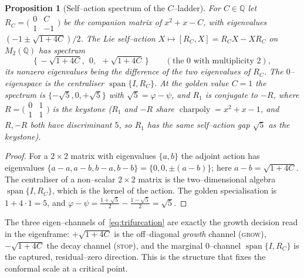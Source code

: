 \documentclass[11pt]{article}
\theoremstyle{plain}
\newtheorem{proposition}[theorem]{Proposition}
\theoremstyle{definition}
\theoremstyle{remark}
\newcommand{\Q}{\mathbb{Q}}
\newcommand{\charpoly}{\operatorname{charpoly}}
\DeclareMathOperator{\spn}{span}
\begin{document}
\begin{proposition}[Self--action spectrum of the $C$--ladder]\label{prop:trifurcation}
For $C\in\Q$ let $R_C=\big(\begin{smallmatrix}0&C\\1&-1\end{smallmatrix}\big)$ be the companion matrix of
$x^2+x-C$, with eigenvalues $(-1\pm\sqrt{1+4C})/2$. The Lie self--action $X\mapsto[R_C,X]=R_CX-XR_C$ on
$M_2(\Q)$ has spectrum
\begin{equation}\label{eq:trifurcation}
  \big\{\,-\sqrt{1+4C},\;\,0,\;\,+\sqrt{1+4C}\,\big\}\qquad(\text{the }0\text{ with multiplicity }2),
\end{equation}
its nonzero eigenvalues being the difference of the two eigenvalues of $R_C$. The $0$--eigenspace is the
centraliser $\spn\{I,R_C\}$. At the golden value $C=1$ the spectrum is $\{-\sqrt5,0,+\sqrt5\}$ with
$\sqrt5=\varphi-\psi$, and $R_1$ is conjugate to $-R$, where $R=\big(\begin{smallmatrix}0&1\\1&1\end{smallmatrix}\big)$ is the keystone
($R_1$ and $-R$ share $\charpoly=x^2+x-1$, and $R,-R$ both have discriminant $5$, so $R_1$ has the same self--action gap $\sqrt5$ as the keystone).
\end{proposition}
\begin{proof}
For a $2\times2$ matrix with eigenvalues $\{a,b\}$ the adjoint action has eigenvalues $\{a-a,a-b,b-a,b-b\}=
\{0,0,\pm(a-b)\}$; here $a-b=\sqrt{1+4C}$. The centraliser of a non--scalar $2\times2$ matrix is the
two--dimensional algebra $\spn\{I,R_C\}$, which is the kernel of the action. The golden specialisation is
$1+4\cdot1=5$, and $\varphi-\psi=\tfrac{1+\sqrt5}2-\tfrac{1-\sqrt5}2=\sqrt5$.
\end{proof}

The three eigen--channels of~\eqref{eq:trifurcation} are exactly the growth decision read in the eigenframe:
$+\sqrt{1+4C}$ is the off--diagonal \emph{growth} channel (\textsc{grow}), $-\sqrt{1+4C}$ the decay channel
(\textsc{stop}), and the marginal $0$--channel $\spn\{I,R_C\}$ is the captured, residual--zero direction. This is
the structure that fixes the conformal scale at a critical point.
\end{document}
